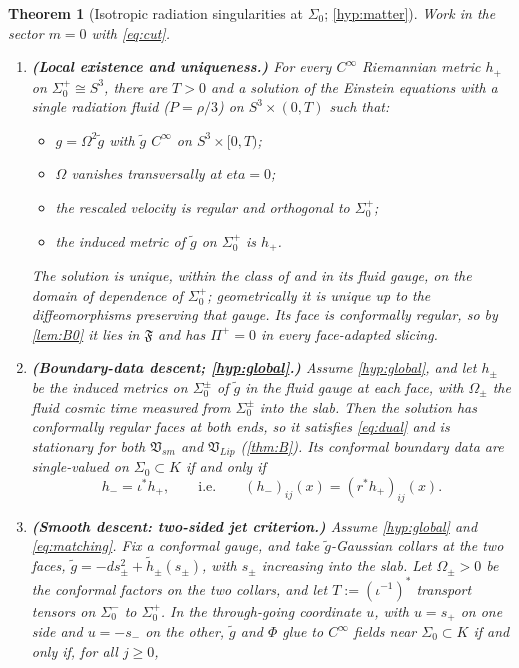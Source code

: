 \documentclass[11pt]{article}
\theoremstyle{canonmath}
\theoremstyle{canonpostulate}
\theoremstyle{canonproposition}
\theoremstyle{canonmath}
\newtheorem{mainthm}{Theorem}
\theoremstyle{canonproposition}
\providecommand{\Vlip}{\mathfrak{V}_{\mathrm{Lip}}}
\providecommand{\Vsm}{\mathfrak{V}_{\mathrm{sm}}}
\providecommand{\Fcl}{\mathfrak{F}}
\providecommand{\Klein}{\mathcal{K}}
\def\mathrm#1{#1}%
\def\mathcal#1{#1}%
\def\eta{eta}%
\begin{document}
\begin{mainthm}[Isotropic radiation singularities at $\Sigma_0$; \ref{hyp:matter}]\label{thm:C}
Work in the sector $m=0$ with \eqref{eq:cut}.
\begin{enumerate}[label=(\alph*)]
\item \textbf{(Local existence and uniqueness.)} For every $C^\infty$ Riemannian metric $h_+$ on $\Sigma_0^+\cong S^3$, there are $T>0$ and a solution of the Einstein equations with a single radiation fluid ($P = \rho/3$) on $S^3\times(0,T)$ such that:
\begin{itemize}
\item $g = \Omega^2\tilde{g}$ with $\tilde{g}$ $C^\infty$ on $S^3\times[0,T)$;
\item $\Omega$ vanishes transversally at $\eta = 0$;
\item the rescaled velocity is regular and orthogonal to $\Sigma_0^+$;
\item the induced metric of $\tilde g$ on $\Sigma_0^+$ is $h_+$.
\end{itemize}
The solution is unique, within the class of \cite{AnguigeTod1999a} and in its fluid gauge, on the domain of dependence of $\Sigma_0^+$; geometrically it is unique up to the diffeomorphisms preserving that gauge. Its face is conformally regular, so by \cref{lem:B0} it lies in $\Fcl$ and has $\Pi^+ = 0$ in every face-adapted slicing.
\item \textbf{(Boundary-data descent; \ref{hyp:global}.)} Assume \ref{hyp:global}, and let $h_\pm$ be the induced metrics on $\Sigma_0^\pm$ of $\tilde g$ in the fluid gauge at each face, with $\Omega_\pm$ the fluid cosmic time measured from $\Sigma_0^\pm$ into the slab. Then the solution has conformally regular faces at both ends, so it satisfies \eqref{eq:dual} and is stationary for both $\Vsm$ and $\Vlip$ (\cref{thm:B}). Its conformal boundary data are single-valued on $\Sigma_0\subset\Klein$ if and only if
\begin{equation}
h_- = \iota^*h_+, \qquad\text{i.e.}\qquad (h_-)_{ij}(x) = (r^*h_+)_{ij}(x).
\label{eq:matching}
\end{equation}
\item \textbf{(Smooth descent: two-sided jet criterion.)} Assume \ref{hyp:global} and \eqref{eq:matching}. Fix a conformal gauge, and take $\tilde g$-Gaussian collars at the two faces, $\tilde g = -ds_\pm^2 + \tilde h_\pm(s_\pm)$, with $s_\pm$ increasing into the slab. Let $\Omega_\pm>0$ be the conformal factors on the two collars, and let $T := (\iota^{-1})^*$ transport tensors on $\Sigma_0^-$ to $\Sigma_0^+$. In the through-going coordinate $u$, with $u = s_+$ on one side and $u = -s_-$ on the other, $\tilde g$ and $\Phi$ glue to $C^\infty$ fields near $\Sigma_0\subset\Klein$ if and only if, for all $j\ge0$,

\end{enumerate}
\end{mainthm}
\end{document}
